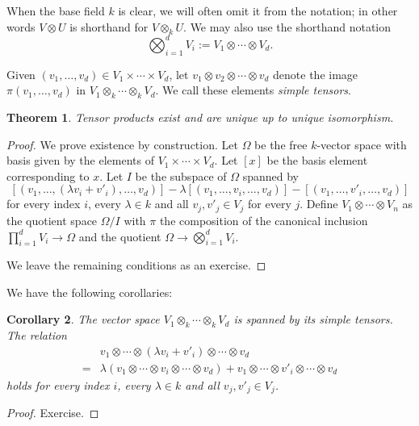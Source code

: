 \documentclass[12pt]{article}
\theoremstyle{plain}
\newtheorem{theorem}{Theorem}[section]
\newtheorem{corollary}[theorem]{Corollary}
\theoremstyle{definition}
\theoremstyle{remark}
\numberwithin{equation}{section}
\begin{document}
When the base field $k$ is clear, we will often omit it from the
notation; in other words $V \otimes U$ is shorthand for $V \otimes_k U$.
We may also use the shorthand notation
\[
\bigotimes_{i=1}^d V_i := V_1 \otimes \cdots \otimes V_d .
\]

Given $(v_1,\ldots, v_d) \in V_1 \times \cdots \times V_d$,
let $v_1 \otimes v_2 \otimes \cdots \otimes v_d$ denote the image
$\pi(v_1,\ldots,v_d)$ in $V_1 \otimes_k \cdots \otimes_k V_d$.
We call these elements \emph{simple tensors}.

\begin{theorem}
Tensor products exist and are unique up to unique isomorphism.
\end{theorem}

\begin{proof}
We prove existence by construction.
Let $\Omega$ be the free $k$-vector space with basis given by the elements of
$V_1 \times \cdots \times V_d$.  Let $[x]$ be the basis element
corresponding to $x$.
Let $I$ be the subspace of $\Omega$ spanned by
\[
[(v_1, \ldots, (\lambda v_i + v'_i), \ldots, v_d)]
-
\lambda[(v_1, \ldots,v_i, \ldots, v_d)] -
[(v_1, \ldots, v'_i, \ldots, v_d)]
\]
for every index $i$, every $\lambda \in k$ and all $v_j,v'_j \in V_j$
for every $j$.
Define $V_1 \otimes \cdots \otimes V_n$ as the quotient space
$\Omega/I$ with $\pi$ the composition of the canonical inclusion
$\prod_{i=1}^d V_i \to \Omega$ and the quotient $\Omega \to
\bigotimes_{i=1}^d V_i$.

We leave the remaining conditions as an exercise.
\end{proof}

We have the following corollaries:

\begin{corollary}
The vector space $V_1 \otimes_k \cdots \otimes_k V_d$
is spanned by its simple tensors.
The relation
\begin{align*}
&v_1 \otimes \cdots \otimes (\lambda v_i + v'_i) \otimes \cdots \otimes
v_d\\
=&
\lambda(v_1 \otimes \cdots \otimes v_i \otimes \cdots \otimes v_d) +
v_1 \otimes \cdots \otimes v'_i \otimes \cdots \otimes v_d
\end{align*}
holds
for every index $i$, every $\lambda \in k$ and all $v_j,v'_j \in V_j$.
\end{corollary}

\begin{proof}
Exercise.
\end{proof}
\end{document}
